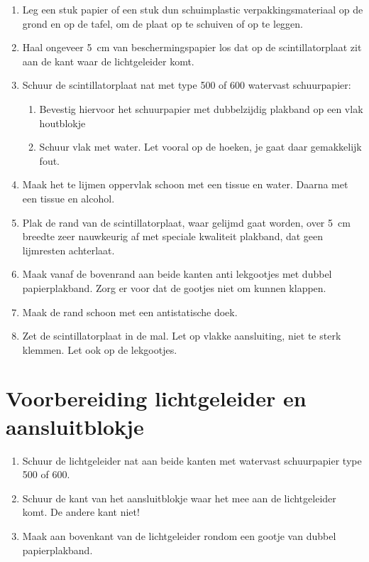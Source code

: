 \begin{enumerate}
    \item Leg een stuk papier of een stuk dun schuimplastic
    verpakkingsmateriaal op de grond en op de tafel, om de plaat op te
    schuiven of op te leggen.
    \item Haal ongeveer \SI{5}{\centi\meter} van beschermingspapier los
    dat op de scintillatorplaat zit aan de kant waar de lichtgeleider
    komt.
    \item Schuur de scintillatorplaat nat met type 500 of 600 watervast
    schuurpapier:
    \begin{enumerate}
        \item Bevestig hiervoor het schuurpapier met dubbelzijdig
        plakband op een vlak houtblokje
        \item Schuur vlak met water. Let vooral op de hoeken, je gaat
        daar gemakkelijk fout.
    \end{enumerate}
    \item Maak het te lijmen oppervlak schoon met een tissue en water.
    Daarna met een tissue en alcohol.
    \item Plak de rand van de scintillatorplaat, waar gelijmd gaat
    worden, over \SI{5}{\centi\meter} breedte zeer nauwkeurig af met
    speciale kwaliteit plakband, dat geen lijmresten achterlaat.
    \item Maak vanaf de bovenrand aan beide kanten anti lekgootjes met
    dubbel papierplakband. Zorg er voor dat de gootjes niet om kunnen
    klappen.
    \item Maak de rand schoon met een antistatische doek.
    \item Zet de scintillatorplaat in de mal. Let op vlakke aansluiting,
    niet te sterk klemmen. Let ook op de lekgootjes.
\end{enumerate}


\section{Voorbereiding lichtgeleider en aansluitblokje}

\begin{enumerate}
    \item Schuur de lichtgeleider nat aan beide kanten met watervast
    schuurpapier type 500 of 600.
    \item Schuur de kant van het aansluitblokje waar het mee aan de
    lichtgeleider komt. De andere kant niet!
    \item Maak aan bovenkant van de lichtgeleider rondom een gootje van
    dubbel papierplakband.
\end{enumerate}


